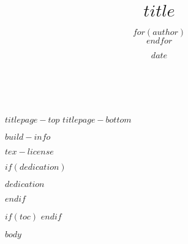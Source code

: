 \documentclass[
  notoc %
]{tufte-book}
\title{$title$}
\author{$for(author)$\noindent{$author$}\\[3mm] $endfor$}
\date{$date$}
\begin{document}
\makeatletter
\thispagestyle{empty}
\vfill
{\Huge\bf
\noindent
\@title
}\\[1in]
{\Large
\noindent
\@author
}
\makeatother

\makeatletter
\newpage
\thispagestyle{empty}
\vfill
{\noindent
$titlepage-top$
}
\vfill
$titlepage-bottom$

$build-info$

$tex-license$
\makeatother

$if(dedication)$
\newpage
\thispagestyle{empty}
\begin{center}
    \vspace*{\fill}
    $dedication$
    \vspace*{\fill}
\end{center}
\cleardoublepage
$endif$

\mainmatter

$if(toc)$
\setcounter{tocdepth}{$tocdepth$}
\tableofcontents
$endif$

\justifying

\setlength{\parindent}{0pt}

$body$

\backmatter
\end{document}
